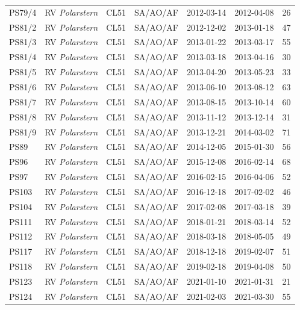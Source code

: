 \documentclass[12pt,a4paper]{article}
\begin{document}
\begin{table}
\begin{tabular}{llllllr}
PS79/4   & RV \emph{Polarstern}          & CL51    & SA/AO/AF & 2012-03-14 & 2012-04-08 & 26 \\
PS81/2   & RV \emph{Polarstern}          & CL51    & SA/AO/AF & 2012-12-02 & 2013-01-18 & 47 \\
PS81/3   & RV \emph{Polarstern}          & CL51    & SA/AO/AF & 2013-01-22 & 2013-03-17 & 55 \\
PS81/4   & RV \emph{Polarstern}          & CL51    & SA/AO/AF & 2013-03-18 & 2013-04-16 & 30 \\
PS81/5   & RV \emph{Polarstern}          & CL51    & SA/AO/AF & 2013-04-20 & 2013-05-23 & 33 \\
PS81/6   & RV \emph{Polarstern}          & CL51    & SA/AO/AF & 2013-06-10 & 2013-08-12 & 63 \\
PS81/7   & RV \emph{Polarstern}          & CL51    & SA/AO/AF & 2013-08-15 & 2013-10-14 & 60 \\
PS81/8   & RV \emph{Polarstern}          & CL51    & SA/AO/AF & 2013-11-12 & 2013-12-14 & 31 \\
PS81/9   & RV \emph{Polarstern}          & CL51    & SA/AO/AF & 2013-12-21 & 2014-03-02 & 71 \\
PS89     & RV \emph{Polarstern}          & CL51    & SA/AO/AF & 2014-12-05 & 2015-01-30 & 56 \\
PS96     & RV \emph{Polarstern}          & CL51    & SA/AO/AF & 2015-12-08 & 2016-02-14 & 68 \\
PS97     & RV \emph{Polarstern}          & CL51    & SA/AO/AF & 2016-02-15 & 2016-04-06 & 52 \\
PS103    & RV \emph{Polarstern}          & CL51    & SA/AO/AF & 2016-12-18 & 2017-02-02 & 46 \\
PS104    & RV \emph{Polarstern}          & CL51    & SA/AO/AF & 2017-02-08 & 2017-03-18 & 39 \\
PS111    & RV \emph{Polarstern}          & CL51    & SA/AO/AF & 2018-01-21 & 2018-03-14 & 52 \\
PS112    & RV \emph{Polarstern}          & CL51    & SA/AO/AF & 2018-03-18 & 2018-05-05 & 49 \\
PS117    & RV \emph{Polarstern}          & CL51    & SA/AO/AF & 2018-12-18 & 2019-02-07 & 51 \\
PS118    & RV \emph{Polarstern}          & CL51    & SA/AO/AF & 2019-02-18 & 2019-04-08 & 50 \\
PS123    & RV \emph{Polarstern}          & CL51    & SA/AO/AF & 2021-01-10 & 2021-01-31 & 21 \\
PS124    & RV \emph{Polarstern}          & CL51    & SA/AO/AF & 2021-02-03 & 2021-03-30 & 55 \\

\end{tabular}
\end{table}
\end{document}
